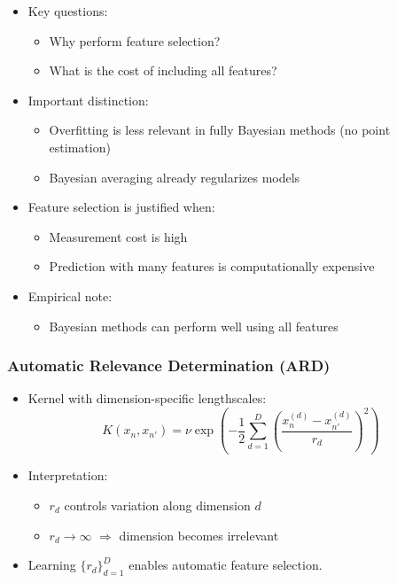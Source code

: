 \documentclass[12pt,oneside]{book}
\numberwithin{equation}{section}
\theoremstyle{definition}
\theoremstyle{plain}
\theoremstyle{remark}
\begin{document}
\begin{itemize}
\item Key questions:
\begin{itemize}
\item Why perform feature selection?
\item What is the cost of including all features?
\end{itemize}

\item Important distinction:
\begin{itemize}
\item Overfitting is less relevant in fully Bayesian methods (no point estimation)
\item Bayesian averaging already regularizes models
\end{itemize}

\item Feature selection is justified when:
\begin{itemize}
\item Measurement cost is high
\item Prediction with many features is computationally expensive
\end{itemize}

\item Empirical note:
\begin{itemize}
\item Bayesian methods can perform well using all features
\end{itemize}
\end{itemize}

\subsubsection*{Automatic Relevance Determination (ARD)}

\begin{itemize}
\item Kernel with dimension-specific lengthscales:
\[
K(x_n, x_{n'}) = \nu \exp\left(-\frac{1}{2} \sum_{d=1}^D \left(\frac{x_n^{(d)} - x_{n'}^{(d)}}{r_d}\right)^2\right)
\]

\item Interpretation:
\begin{itemize}
\item $r_d$ controls variation along dimension $d$
\item $r_d \to \infty$ $\Rightarrow$ dimension becomes irrelevant
\end{itemize}

\item Learning $\{r_d\}_{d=1}^D$ enables automatic feature selection.
\end{itemize}
\end{document}
